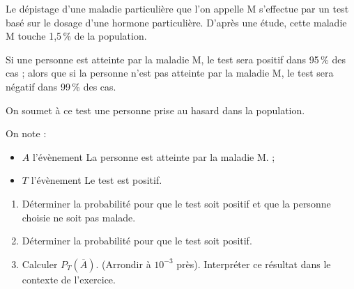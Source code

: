 \medskip

Le dépistage d'une maladie particulière que l'on appelle M s'effectue par un test basé sur le dosage d'une hormone particulière. D'après une étude, cette maladie M touche 1,5\,\% de la population.

Si une personne est atteinte par la maladie M, le test sera positif dans 95\,\% des cas ; alors que si la personne n'est pas atteinte par la maladie M, le test sera négatif dans 99\,\% des cas.

On soumet à ce test une personne prise au hasard dans la population.

On note :

\begin{itemize}
\item $A$ l'évènement \og La personne est atteinte par la maladie M.\fg{} ;
\item $T$ l'évènement \og Le test est positif\fg.
\end{itemize}
\begin{enumerate}
\item Déterminer la probabilité pour que le test soit positif et que la personne choisie ne soit pas malade.
\item Déterminer la probabilité pour que le test soit positif.
\item Calculer $P_T\left(\overline{A}\right)$. (Arrondir à $10^{-3}$ près). Interpréter ce résultat dans le contexte de l'exercice.
\end{enumerate}

\vspace{0,5cm}
